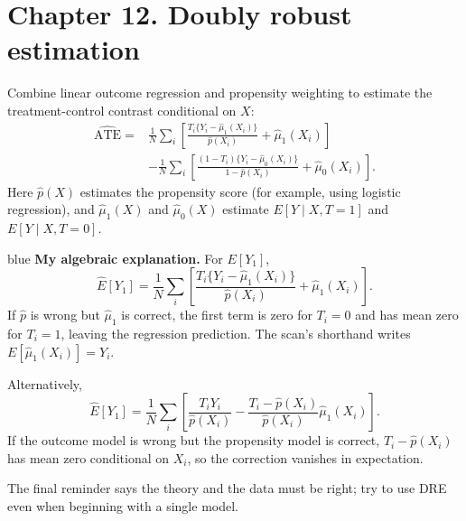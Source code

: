 {\section{Chapter 12. Doubly robust estimation}
Combine linear outcome regression and propensity weighting to estimate the treatment-control contrast conditional on $X$:
\begin{align*}
\widehat{\mathrm{ATE}}={}&\frac1N\sum_i\left[\frac{T_i\{Y_i-\hat\mu_1(X_i)\}}{\hat p(X_i)}+\hat\mu_1(X_i)\right]\\
&-\frac1N\sum_i\left[\frac{(1-T_i)\{Y_i-\hat\mu_0(X_i)\}}{1-\hat p(X_i)}+\hat\mu_0(X_i)\right].
\end{align*}
Here $\hat p(X)$ estimates the propensity score (for example, using logistic regression), and $\hat\mu_1(X)$ and $\hat\mu_0(X)$ estimate $E[Y\mid X,T=1]$ and $E[Y\mid X,T=0]$. 

\begin{inkblock}{blue}
\textbf{My algebraic explanation.} For $E[Y_1]$,
\[\widehat E[Y_1]=\frac1N\sum_i\left[\frac{T_i\{Y_i-\hat\mu_1(X_i)\}}{\hat p(X_i)}+\hat\mu_1(X_i)\right].\]
If $\hat p$ is wrong but $\hat\mu_1$ is correct, the first term is zero for $T_i=0$ and has mean zero for $T_i=1$, leaving the regression prediction. The scan's shorthand writes $E[\hat\mu_1(X_i)]=Y_i$.

Alternatively,
\[\widehat E[Y_1]=\frac1N\sum_i\left[\frac{T_iY_i}{\hat p(X_i)}-\frac{T_i-\hat p(X_i)}{\hat p(X_i)}\hat\mu_1(X_i)\right].\]
If the outcome model is wrong but the propensity model is correct, $T_i-\hat p(X_i)$ has mean zero conditional on $X_i$, so the correction vanishes in expectation. \end{inkblock}
The final reminder says the theory and the data must be right; try to use DRE even when beginning with a single model.

}
